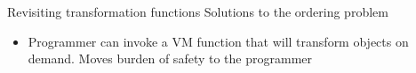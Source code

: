 \ifdraft{}{



}

\begin{frame}[t,fragile]{Revisiting transformation functions}%
Solutions to the ordering problem \\
\begin{itemize}
\item Programmer can invoke a VM function that will transform objects on
demand. Moves burden of safety to the programmer
\end{itemize}
\end{frame}

% 
